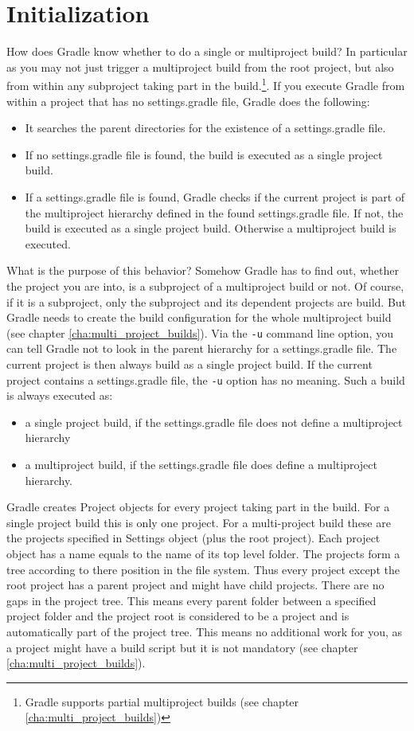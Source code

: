 \section{Initialization} %
\label{sec:initialization}
How does Gradle know whether to do a single or multiproject build? In particular as you may not just trigger a multiproject build from the root project, but also from within any subproject taking part in the build.\footnote{Gradle supports partial multiproject builds (see chapter \ref{cha:multi_project_builds})}. If you execute Gradle from within a project that has no settings.gradle file, Gradle does the following:
\begin{itemize}
	\item It searches the parent directories for the existence of a settings.gradle file.
	\item If no settings.gradle file is found, the build is executed as a single project build.
    \item If a settings.gradle file is found, Gradle checks if the current project is part of the multiproject hierarchy defined in the found settings.gradle file. If not, the build is executed as a single project build. Otherwise a multiproject build is executed.
\end{itemize}
What is the purpose of this behavior? Somehow Gradle has to find out, whether the project you are into, is a subproject of a multiproject build or not. Of course, if it is a subproject, only the subproject and its dependent projects are build. But Gradle needs to create the build configuration for the whole multiproject build (see chapter \ref{cha:multi_project_builds}). Via the \texttt{-u} command line option, you can tell Gradle not to look in the parent hierarchy for a settings.gradle file. The current project is then always build as a single project build. If the current project contains a settings.gradle file, the \texttt{-u} option has no meaning. Such a build is always executed as:
\begin{itemize}
	\item a single project build, if the settings.gradle file does not define a multiproject hierarchy
    \item a multiproject build, if the settings.gradle file does define a multiproject hierarchy.
\end{itemize}
Gradle creates Project objects for every project taking part in the build. For a single project build this is only one project. For a multi-project build these are the projects specified in Settings object (plus the root project). Each project object has a name equals to the name of its top level folder. The projects form a tree according to there position in the file system. Thus every project except the root project has a parent project and might have child projects. There are no gaps in the project tree. This means every parent folder between a specified project folder and the project root is considered to be a project and is automatically part of the project tree. This means no additional work for you, as a project might have a build script but it is not mandatory (see chapter \ref{cha:multi_project_builds}).

